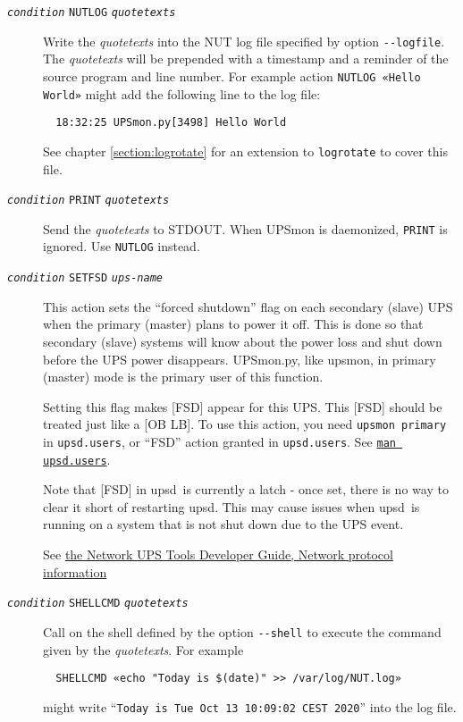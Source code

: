 \documentclass[12pt]{article}
\newcommand{\upsd}{\mbox{\textcolor{UPSDCOLOUR}{upsd}}}
\newcommand{\upsmon}{\mbox{\textcolor{MONCOLOUR}{upsmon}}}
\newcommand{\UPSmon}{\mbox{\textcolor{UPSMONCOLOUR}{UPSmon.py}}}
\newcommand{\status}[1]{\textcolor{UPSDCOLOUR}{[{#1}]}}
\newcommand{\ttit}[1]{\texttt{\textit{#1}}}
\newcommand{\upsdusers}{\textcolor{UPSDCOLOUR}{\texttt{upsd.users}}}
\newcommand{\NUTman}[1]{\href{https://networkupstools.org/docs/man/#1.html}{\texttt{man #1}}}
\begin{document}
\begin{description}
\begin{description}
\item[\ttit{condition} \texttt{NUTLOG} \ttit{quotetexts}] \hspace{7mm}
  Write the \textit{quotetexts} into the NUT log file specified by option
  \texttt{-\/-logfile}.  The \textit{quotetexts} will be prepended with a
  timestamp and a reminder of the source program and line number.  For example
  action \texttt{NUTLOG «Hello World»} might add the following line to the log
  file:
  \begin{verbatim}
  18:32:25 UPSmon.py[3498] Hello World\end{verbatim}
  See chapter \ref{section:logrotate} for an extension to \texttt{logrotate}
  to cover this file.

\item[\ttit{condition} \texttt{PRINT} \ttit{quotetexts}] \hspace{7mm}
  Send the \textit{quotetexts} to STDOUT.  When UPSmon is daemonized,
  \texttt{PRINT} is ignored.  Use \texttt{NUTLOG} instead.

\item[\ttit{condition} \texttt{SETFSD} \ttit{ups-name}] \hspace{7mm} This
  action sets the ``forced shutdown'' flag on each secondary (slave) UPS when
  the primary (master) plans to power it off. This is done so that secondary
  (slave) systems will know about the power loss and shut down before the UPS
  power disappears.  \UPSmon, like \upsmon, in primary (master) mode is the
  primary user of this function.

Setting this flag makes \status{FSD} appear for this UPS.  This \status{FSD}
should be treated just like a \status{OB LB}.  To use this action, you need
\texttt{upsmon primary} in \upsdusers, or ``FSD'' action granted in \upsdusers.
See \NUTman{upsd.users}. 

Note that \status{FSD} in \upsd\ is currently a latch - once set, there is no
way to clear it short of restarting \upsd.  This may cause issues when
\upsd\ is running on a system that is not shut down due to the UPS event.

See \href{https://networkupstools.org/docs/developer-guide.chunked/ar01s09.html}%
         {the Network UPS Tools Developer Guide, Network protocol information}

\item[\ttit{condition} \texttt{SHELLCMD} \ttit{quotetexts}] \hspace{7mm}
  Call on the shell defined by the option \texttt{-\/-shell} to execute the
  command given by the \textit{quotetexts}.  For example
  \begin{verbatim}
  SHELLCMD «echo "Today is $(date)" >> /var/log/NUT.log»\end{verbatim}
  might write ``\texttt{Today is Tue Oct 13 10:09:02 CEST 2020}'' into the log file.


\end{description}
\end{description}
\end{document}
